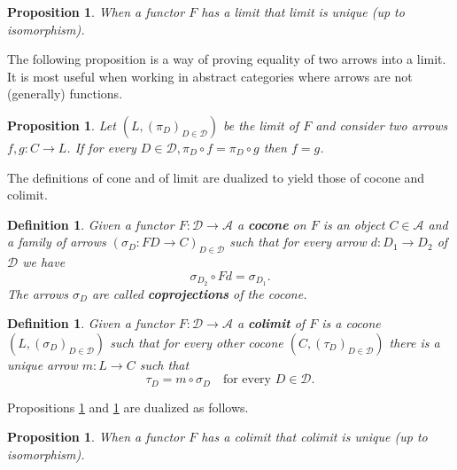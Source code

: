 \documentclass[letterpaper, 11pt, oneside]{memoir}
\theoremstyle{myteo}
\newtheorem{proposition}[theorem]{Proposition}
\newtheorem{definition}[theorem]{Definition}
\numberwithin{equation}{section}
\newcommand{\marginnote}[1]{\marginpar{\footnotesize #1}}
\newcommand{\A}{\mathscr{A}}
\begin{document}
\begin{proposition}
  \label{prop:limit_uniqueness}
  When a functor \(F\) has a limit that limit is unique (up to isomorphism).
\end{proposition}

The following proposition is a way of proving equality of two arrows into a limit.
It is most useful when working in abstract categories where arrows are not (generally) functions.

\begin{proposition}
  \label{prop:arrows_into_limit}
  Let \((L, (\pi_D)_{D \in \mathscr{D}})\) be the limit of \(F\) and consider two arrows \(f,g \colon C \to L\).
  If for every \(D \in \mathscr{D}, \pi_D \circ f = \pi_D \circ g\) then \(f = g\).
\end{proposition}

The definitions of cone and of limit are dualized to yield those of cocone and colimit.

\begin{definition}
  Given a functor \(F \colon \mathscr{D} \to \A\) a \textbf{cocone} \marginnote{cocone} on \(F\) is an object \(C \in \A\) and a family of arrows \(\left(\sigma_D \colon FD \to C \right)_{D \in \mathscr{D}}\) such that for every arrow \(d \colon D_1 \to D_2\) of \(\mathscr{D}\) we have
  \begin{equation}
    \label{eq:cocone}
    \sigma_{D_2} \circ Fd = \sigma_{D_1}.
  \end{equation}
  The arrows \(\sigma_D\) are called \textbf{coprojections} of the cocone.
  \marginnote{coprojection}
\end{definition}

\begin{definition}
  Given a functor \(F \colon \mathscr{D} \to \A\) a \textbf{colimit} \marginnote{colimit} of \(F\) is a cocone \((L, (\sigma_D)_{D \in \mathscr{D}})\) such that for every other cocone \((C, (\tau_D)_{D \in \mathscr{D}})\) there is a unique arrow \(m \colon L \to C\) such that
  \begin{equation*}
    \tau_D = m \circ \sigma_D \quad \text{for every \(D \in \mathscr{D}\)}.
  \end{equation*}
\end{definition}

Propositions \ref{prop:limit_uniqueness} and \ref{prop:arrows_into_limit} are dualized as follows.

\begin{proposition}
  \label{prop:colimit_uniqueness}
  When a functor \(F\) has a colimit that colimit is unique (up to isomorphism).
\end{proposition}
\end{document}
